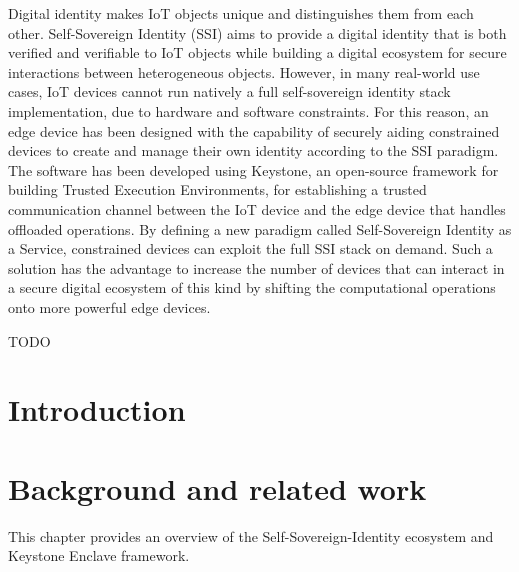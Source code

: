 \documentclass[pdfa%
,twoside%
,12pt%
]{toptesi}
\begin{document}
Digital identity makes IoT objects unique and distinguishes them from each other. Self-Sovereign Identity (SSI) aims to provide a digital identity that is both verified and verifiable to IoT objects while building a digital ecosystem for secure interactions between heterogeneous objects. However, in many real-world use cases, IoT devices cannot run natively a full self-sovereign identity stack implementation, due to hardware and software constraints. For this reason, an edge device has been designed with the capability of securely aiding constrained devices to create and manage their own identity according to the SSI paradigm. The software has been developed using Keystone, an open-source framework for building Trusted Execution Environments, for establishing a trusted communication channel between the IoT device and the edge device that handles offloaded operations. By defining a new paradigm called Self-Sovereign Identity as a Service, constrained devices can exploit the full SSI stack on demand. Such a solution has the advantage to increase the number of devices that can interact in a secure digital ecosystem of this kind by shifting the computational operations onto more powerful edge devices. 

\ringraziamenti

{\color{red} TODO}



\indici

\mainmatter

\chapter{Introduction}
\label{chap:1}


\chapter{Background and related work}
\label{chap:2}
This chapter provides an overview of the Self-Sovereign-Identity ecosystem and Keystone Enclave framework.


\end{document}

